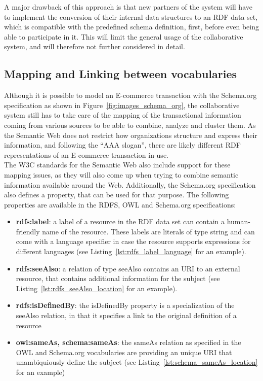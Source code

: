 A major drawback of this approach is that new partners of the system will have to implement the conversion of their internal data structures to an \gls{RDF} data set, which is compatible with the predefined schema definition, first, before even being able to participate in it. This will limit the general usage of the collaborative system, and will therefore not further considered in detail.


\subsection{Mapping and Linking between vocabularies}

Although it is possible to model an \gls{E-commerce} transaction with the Schema.org specification as shown in Figure~\ref{fig:images_schema_org}, the collaborative system still has to take care of the mapping of the transactional information coming from various sources to be able to combine, analyze and cluster them. As the Semantic Web does not restrict how organizations structure and express their information, and following the ``AAA slogan'', there are likely different \gls{RDF} representations of an \gls{E-commerce} transaction in-use. \\

The \gls{W3C} standards for the Semantic Web also include support for these mapping issues, as they will also come up when trying to combine semantic information available around the Web. Additionally, the Schema.org specification also defines a property, that can be used for that purpose. The following properties are available in the \gls{RDFS}, \gls{OWL} and Schema.org specifications: \@

\begin{itemize}
	\item \textbf{rdfs:label}: a label of a resource in the \gls{RDF} data set can contain a human-friendly name of the resource. These labels are literals of type string and can come with a language specifier in case the resource supports expressions for different languages (see Listing~\ref{lst:rdfs_label_language} for an example).
	\item \textbf{rdfs:seeAlso}: a relation of type seeAlso contains an \gls{URI} to an external resource, that contains additional information for the subject (see Listing~\ref{lst:rdfs_seeAlso_location} for an example).
	\item \textbf{rdfs:isDefinedBy}: the isDefinedBy property is a specialization of the seeAlso relation, in that it specifies a link to the original definition of a resource
	\item \textbf{owl:sameAs, schema:sameAs}: the sameAs relation as specified in the \gls{OWL} and Schema.org vocabularies are providing an unique \gls{URI} that unambiquiously define the subject (see Listing~\ref{lst:schema_sameAs_location} for an example)
\end{itemize}


